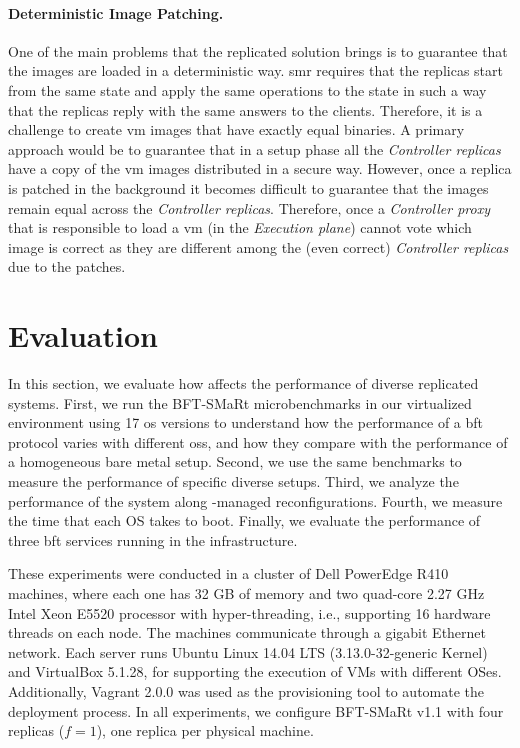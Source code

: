 \paragraph{Deterministic Image Patching.}
One of the main problems that the replicated solution brings is to guarantee that the images are loaded in a deterministic way.
\gls{smr} requires that the replicas start from the same state and apply the same operations to the state in such a way that the replicas reply with the same answers to the clients.
Therefore, it is a challenge to create \gls{vm} images that have exactly equal binaries.
A primary approach would be to guarantee that in a setup phase all the \emph{Controller replicas} have a copy of the \gls{vm} images distributed in a secure way. 
However, once a replica is patched in the background it becomes difficult to guarantee that the images remain equal across the \emph{Controller replicas}.
Therefore, once a \emph{Controller proxy} that is responsible to load a \gls{vm} (in the \emph{Execution plane}) cannot vote which image is correct as they are different among the (even correct) \emph{Controller replicas} due to the patches.




\section{Evaluation}
\label{sec:overhead}

In this section, we evaluate how \system affects the performance of diverse replicated systems.
First, we run the BFT-SMaRt microbenchmarks in our virtualized environment using 17 \gls{os} versions to understand how the performance of a \gls{bft} protocol varies with different \glspl{os}, and how they compare with the performance of a homogeneous bare metal setup.
Second, we use the same benchmarks to measure the performance of specific diverse setups.
Third, we analyze the performance of the system along \system-managed reconfigurations.
Fourth, we measure the time that each OS takes to boot.
Finally, we evaluate the performance of three \gls{bft} services running in the \system infrastructure.


These experiments were conducted in a cluster of Dell PowerEdge R410 machines, where each one has 32 GB of memory and two quad-core 2.27 GHz Intel Xeon E5520 processor with hyper-threading, i.e., supporting 16 hardware threads on each node.
The machines communicate through a gigabit Ethernet network.
Each server runs Ubuntu Linux 14.04 LTS (3.13.0-32-generic Kernel) and VirtualBox 5.1.28, for supporting the execution of VMs with different OSes. 
Additionally, Vagrant 2.0.0 was used as the provisioning tool to automate the deployment process.
In all experiments, we configure BFT-SMaRt v1.1 with four replicas ($f=1$), one replica per physical machine.

